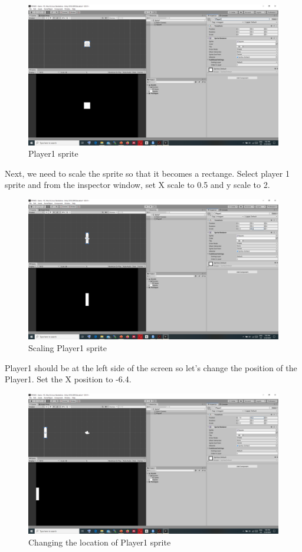 \documentclass[
]{book}
\begin{document}
\begin{figure}
\centering
\includegraphics{Images/Player1.png}
\caption{Player1 sprite}
\end{figure}

Next, we need to scale the sprite so that it becomes a rectange. Select player 1 sprite and from the inspector window, set X scale to 0.5 and y scale to 2.

\begin{figure}
\centering
\includegraphics{Images/Player1-scale.png}
\caption{Scaling Player1 sprite}
\end{figure}

Player1 should be at the left side of the screen so let's change the position of the Player1. Set the X position to -6.4.

\begin{figure}
\centering
\includegraphics{Images/Player1-position.png}
\caption{Changing the location of Player1 sprite}
\end{figure}
\end{document}
